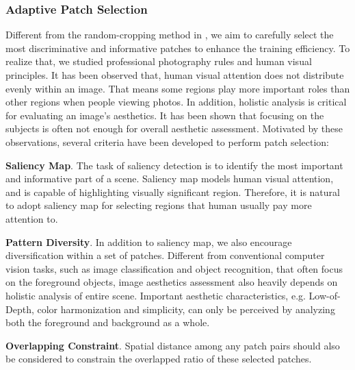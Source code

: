 \documentclass[10pt,twocolumn,letterpaper]{article}
\begin{document}
	\subsubsection{Adaptive Patch Selection}
	Different from the random-cropping method in \cite{Lu:2015:ICCV}, we aim to carefully select the most discriminative and informative patches to enhance the training efficiency. To realize that, we studied professional photography rules and human visual principles. It has been observed that, human visual attention does not distribute evenly within an image. That means some regions play more important roles than other regions when people viewing photos. In addition, holistic analysis is critical for evaluating an image's aesthetics. It has been shown that focusing on the subjects is often not enough for overall aesthetic assessment. Motivated by these observations, several criteria have been developed to perform patch selection:
	
	\textbf{Saliency Map}. The task of saliency detection is to identify the most important and informative part of a scene. Saliency map models human visual attention, and is capable of highlighting visually significant region. Therefore, it is natural to adopt saliency map for selecting regions that human usually pay more attention to.
	
	\textbf{Pattern Diversity}. In addition to saliency map, we also encourage diversification within a set of patches. Different from conventional computer vision tasks, such as image classification and object recognition, that often focus on the foreground objects, image aesthetics assessment also heavily depends on holistic analysis of entire scene. Important aesthetic characteristics, e.g. Low-of-Depth, color harmonization and simplicity, can only be perceived by analyzing both the foreground and background as a whole. 
	
	\textbf{Overlapping Constraint}. Spatial distance among any patch pairs should also be considered to constrain the overlapped ratio of these selected patches. 
	
\end{document}
